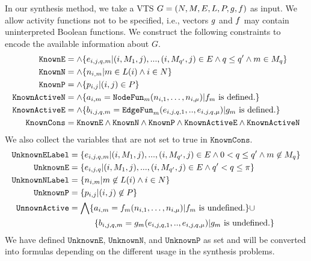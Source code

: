 In our synthesis method, we take a VTS $G =
(N,M,E,L,P,g,f)$ as input.
%
We allow activity functions not to be specified, i.e., vectors
$g$ and $f$ may contain uninterpreted Boolean functions.
%
We construct the following constraints to encode the available information
about $G$.
%
\begin{align*}
  \texttt{KnownE} &= \land \{e_{i,j,q,m}|(i,M_1,j),...,(i,M_{q'},j) \in E \land q \leq q' \land m \in M_q \}\\
  \texttt{KnownN} &= \land \{n_{i,m}| m \in L(i) \land i \in N \}\\
  \texttt{KnownP} &= \land \{p_{i,j}| (i,j) \in P \} \\
  \texttt{KnownActiveN} &= \land \{ a_{i,m} = \texttt{NodeFun}_m (n_{i,1},\dots,n_{i,\mu}) | f_m \text{ is defined.} \} \\
  \texttt{KnownActiveE} &= \land \{ b_{i,j,q,m} = \texttt{EdgeFun}_m(e_{i,j,q,1}, .., e_{i,j,q,\mu})
                   | g_m \text{ is defined.} \} \\
  \texttt{KnownCons} & = \texttt{KnownE} \land \texttt{KnownN} \land 
 \texttt{KnownP} \land \texttt{KnownActiveE} \land \texttt{KnownActiveN}
\end{align*}
We also collect the variables that are not set to true in $\texttt{KnownCons}$.
\begin{align*}
  \texttt{UnknownELabel} &=
  \{e_{i,j,q,m}|(i,M_1,j),...,(i,M_{q'},j) \in E \land 
                          0 < q \leq q' \land m \not\in M_{q} \}\\
  \texttt{UnknownE} &= \{e_{i,j,q}|(i,M_1,j),...,(i,M_{q'},j) \in E \land 
                    q' < q \leq \pi \}\\
  \texttt{UnknownNLabel} &= \{n_{i,m}| m \not\in L(i) \land i \in N \}\\
  \texttt{UnknownP} &= \{p_{i,j}| (i,j) \not\in P \} \\
  \texttt{UnnownActive} &=  \bigwedge \{ a_{i,m} = f_m (n_{i,1},\dots,n_{i,\mu}) | f_m \text{ is undefined.} \} {\cup} \\
   &\quad\quad\quad  \{ b_{i,j,q,m} = g_m(e_{i,j,q,1}, .., e_{i,j,q,\mu})
                   | g_m \text{ is undefined.} \}
\end{align*}
We have defined $\texttt{UnknownE}$, $\texttt{UnknownN}$, and
$\texttt{UnknownP}$
as set and will be converted into formulas depending
on the different usage in the synthesis problems. 

